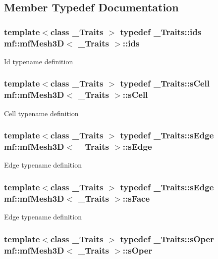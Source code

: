 \subsection{Member Typedef Documentation}
\hypertarget{classmf_1_1mfMesh3D_aeae559d0564bf64617c8fd83ba264895}{
\subsubsection[{ids}]{\setlength{\rightskip}{0pt plus 5cm}template$<$class \_\-Traits $>$ typedef \_\-Traits::ids {\bf mf::mfMesh3D}$<$ \_\-Traits $>$::{\bf ids}}}
\label{classmf_1_1mfMesh3D_aeae559d0564bf64617c8fd83ba264895}
Id typename definition \hypertarget{classmf_1_1mfMesh3D_acbb717ca80998e53d622ab2ae35b9134}{
\subsubsection[{sCell}]{\setlength{\rightskip}{0pt plus 5cm}template$<$class \_\-Traits $>$ typedef \_\-Traits::sCell {\bf mf::mfMesh3D}$<$ \_\-Traits $>$::{\bf sCell}}}
\label{classmf_1_1mfMesh3D_acbb717ca80998e53d622ab2ae35b9134}
Cell typename definition \hypertarget{classmf_1_1mfMesh3D_a93992ed7712bd9dbcc0430166a540d1c}{
\subsubsection[{sEdge}]{\setlength{\rightskip}{0pt plus 5cm}template$<$class \_\-Traits $>$ typedef \_\-Traits::sEdge {\bf mf::mfMesh3D}$<$ \_\-Traits $>$::{\bf sEdge}}}
\label{classmf_1_1mfMesh3D_a93992ed7712bd9dbcc0430166a540d1c}
Edge typename definition \hypertarget{classmf_1_1mfMesh3D_ae70500195d62c66dc79d18394652a2af}{
\subsubsection[{sFace}]{\setlength{\rightskip}{0pt plus 5cm}template$<$class \_\-Traits $>$ typedef \_\-Traits::sEdge {\bf mf::mfMesh3D}$<$ \_\-Traits $>$::{\bf sFace}}}
\label{classmf_1_1mfMesh3D_ae70500195d62c66dc79d18394652a2af}
Edge typename definition \hypertarget{classmf_1_1mfMesh3D_ab30b285a3a7387627cf13798561050a0}{
\subsubsection[{sOper}]{\setlength{\rightskip}{0pt plus 5cm}template$<$class \_\-Traits $>$ typedef \_\-Traits::sOper {\bf mf::mfMesh3D}$<$ \_\-Traits $>$::{\bf sOper}}}
